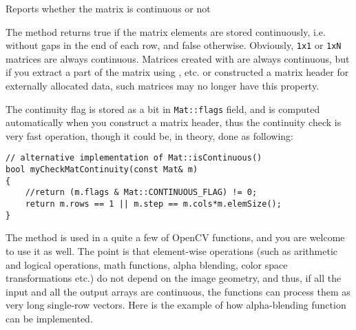 Reports whether the matrix is continuous or not


The method returns true if the matrix elements are stored continuously, i.e. without gaps in the end of each row, and false otherwise. Obviously, \texttt{1x1} or \texttt{1xN} matrices are always continuous. Matrices created with  are always continuous, but if you extract a part of the matrix using ,  etc. or constructed a matrix header for externally allocated data, such matrices may no longer have this property.

The continuity flag is stored as a bit in \texttt{Mat::flags} field, and is computed automatically when you construct a matrix header, thus the continuity check is very fast operation, though it could be, in theory, done as following:

\begin{lstlisting}
// alternative implementation of Mat::isContinuous()
bool myCheckMatContinuity(const Mat& m)
{
    //return (m.flags & Mat::CONTINUOUS_FLAG) != 0;
    return m.rows == 1 || m.step == m.cols*m.elemSize();
}
\end{lstlisting}

The method is used in a quite a few of OpenCV functions, and you are welcome to use it as well. The point is that element-wise operations (such as arithmetic and logical operations, math functions, alpha blending, color space transformations etc.) do not depend on the image geometry, and thus, if all the input and all the output arrays are continuous, the functions can process them as very long single-row vectors. Here is the example of how alpha-blending function can be implemented.

